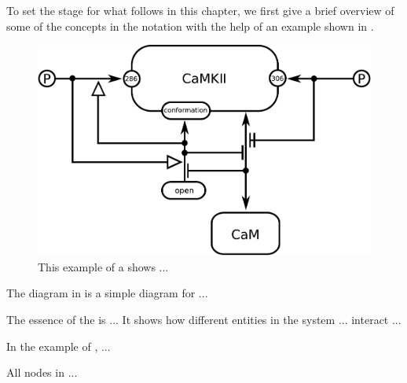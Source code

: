 
To set the stage for what follows in this chapter, we first give a brief overview of some of the concepts in the \ER notation with the help of an example shown in .

\begin{figure}[H]
  \centering
  \vspace*{-0.75em}
  \includegraphics[scale=0.8]{examples/CaMKII-intro}
   \caption{This example of a \ER shows ...}
  \label{fig:eg1}
\end{figure}

The diagram in  is a simple diagram for ...
 
The essence of the \ER is ... It shows how different entities in the system ... interact ...  


In the example of , ...

All nodes in \ER ...


